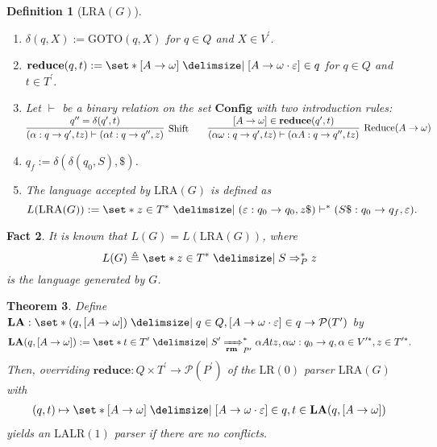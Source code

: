 \documentclass[12pt]{article}
\newtheorem{theorem}{Theorem}
\newtheorem{definition}[theorem]{Definition}
\newtheorem{fact}[theorem]{Fact}
\newcommand{\powerset}{ \ensuremath{\mathcal{P}} }
\begin{document}
\begin{definition}[$\mathrm{LRA}(G)$]
\begin{enumerate}
\item[$\mathrm{(xii)}$] $\delta ( q , X ) := \mathrm{GOTO} ( q , X )$ for $q \in Q$ and $X \in V^\prime$.
\item[$\mathrm{(xiii)}$] $\mathbf{reduce} ( q , t ) := \set*{ [ A \to \omega ] \mid [ A \to \omega \cdot \varepsilon ] \in q }$ for $q \in Q$ and $t \in T^\prime$.
\item[$\mathrm{(xiv)}$] Let $\vdash$ be a binary relation on the set $\mathbf{Config}$ with two introduction rules: \newline $\begin{matrix} \infer[\mathrm{Shift}]{ ( \alpha : q \to q^\prime , t z ) \vdash ( \alpha t : q \to q^{\prime \prime} , z ) }{ q^{\prime \prime} = \delta ( q^\prime , t ) } & & \infer[\mathrm{Reduce} ( A \to \omega )]{ ( \alpha \omega : q \to q^\prime , t z ) \vdash ( \alpha A : q \to q^{\prime \prime} , t z ) }{ [ A \to \omega ] \in \mathbf{reduce} ( q^\prime , t ) } \end{matrix}$
\item[$\mathrm{(xv)}$] $q_f := \delta ( \delta ( q_0 , S ) , \$ )$.
\item[$\mathrm{(xvi)}$] The language accepted by $\mathrm{LRA}(G)$ is defined as \[L ( \mathrm{LRA} ( G ) ) := \set*{ z \in { T }^\ast \mid ( \varepsilon : q_0 \to q_0 , z \$ ) \vdash^\ast ( S \$ : q_0 \to q_f , \varepsilon ) } .\]
\end{enumerate}
\end{definition}

\begin{fact}
It is known that $L ( G ) = L ( \mathrm{LRA} ( G ) )$, where \[L(G) \triangleq \set*{ z \in { T }^\ast \mid S \Rightarrow_{P}^\ast z }\] is the language generated by $G$.
\end{fact}

\begin{theorem}
Define $\mathbf{LA} : \set*{ ( q , [ A \to \omega ] ) \mid q \in Q , [ A \to \omega \cdot \varepsilon ] \in q } \to \powerset ( T^\prime )$ by
\begin{align}
\mathbf{LA} ( q , [ A \to \omega ] ) := \set*{ t \in T^\prime \mid S^\prime \xRightarrow[\mathbf{rm}]{}_{P^\prime}^\ast \alpha A t z , \alpha \omega : q_0 \to q , \alpha \in V^{\prime \ast}, z \in T^{\prime \ast} } .
\end{align}
Then, overriding $\mathbf{reduce} : Q \times T^\prime \to \powerset ( P^\prime )$ of the $\mathrm{LR(0)}$ parser $\mathrm{LRA} ( G )$ with
\begin{align*}
( q , t ) \mapsto \set*{ [ A \to \omega ] \mid [ A \to \omega \cdot \varepsilon ] \in q , t \in \mathbf{LA} ( q , [ A \to \omega ] ) }
\end{align*}
yields an $\mathrm{LALR(1)}$ parser if there are no conflicts.
\end{theorem}
\end{document}
